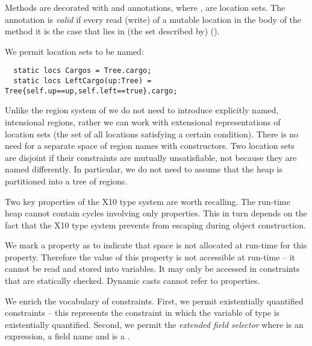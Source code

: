 Methods are decorated with  and 
annotations, where , are location sets. The annotation
is {\em valid} if every read (write) of a mutable location  in the
body of the method it is the case that  lies in (the set
described by)  ().

We permit location sets to be named:
\begin{lstlisting}
  static locs Cargos = Tree.cargo;
  static locs LeftCargo(up:Tree) = Tree{self.up==up,self.left==true}.cargo;
\end{lstlisting}

Unlike the region system of \cite{DPJ} we do not need to introduce
explicitly named, intensional regions, rather we can work with
extensional representations of location sets (the set of all locations
satisfying a certain condition).  There is no need for a separate
space of region names with constructors. Two location sets are
disjoint if their constraints are mutually unsatisfiable, not because
they are named differently. In particular, we do not need to assume
that the heap is partitioned into a tree of regions.

Two key properties of the X10 type system are worth recalling. The run-time
heap cannot contain cycles involving only properties. This in turn
depends on the fact that the X10 type system prevents  from
escaping during object construction\cite{X10-object-initialization}.

We mark a property as  to indicate that space is not
allocated at run-time for this property. Therefore the value of this
property is not accessible at run-time -- it cannot be read and stored
into variables. It may only be accessed in constraints that are
statically checked. Dynamic casts cannot refer to 
properties.

We enrich the vocabulary of constraints. First, we permit
existentially quantified constraints  -- this represents
the constraint  in which the variable  of type
 is existentially quantified. Second, we permit the {\em
  extended field selector}  where  is an
expression,  a field name and  is a . 



